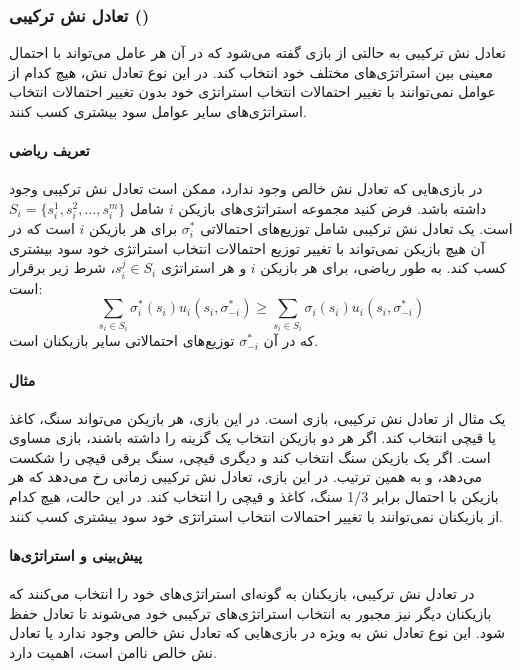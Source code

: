 \subsubsection{تعادل نش ترکیبی ()}
تعادل نش ترکیبی به حالتی از بازی گفته می‌شود که در آن هر عامل می‌تواند با احتمال معینی بین استراتژی‌های مختلف خود انتخاب کند. در این نوع تعادل نش، هیچ کدام از عوامل نمی‌توانند با تغییر احتمالات انتخاب استراتژی خود بدون تغییر احتمالات انتخاب استراتژی‌های سایر عوامل سود بیشتری کسب کنند.

\paragraph{تعریف ریاضی}
در بازی‌هایی که تعادل نش خالص وجود ندارد، ممکن است تعادل نش ترکیبی وجود داشته باشد. فرض کنید مجموعه استراتژی‌های بازیکن \( i \) شامل \( S_i = \{s_i^1, s_i^2, \dots, s_i^m\} \) است. یک تعادل نش ترکیبی شامل توزیع‌های احتمالاتی \( \sigma_i^* \) برای هر بازیکن \( i \) است که در آن هیچ بازیکن نمی‌تواند با تغییر توزیع احتمالات انتخاب استراتژی خود سود بیشتری کسب کند. به طور ریاضی، برای هر بازیکن \( i \) و هر استراتژی \( s_i^j \in S_i \)، شرط زیر برقرار است:
\[
\sum_{s_i \in S_i} \sigma_i^*(s_i) u_i(s_i, \sigma_{-i}^*) \geq \sum_{s_i \in S_i} \sigma_i(s_i) u_i(s_i, \sigma_{-i}^*)
\]
که در آن \( \sigma_{-i}^* \) توزیع‌های احتمالاتی سایر بازیکنان است.

\paragraph{مثال}
یک مثال از تعادل نش ترکیبی، بازی  است. در این بازی، هر بازیکن می‌تواند سنگ، کاغذ یا قیچی انتخاب کند. اگر هر دو بازیکن انتخاب یک گزینه را داشته باشند، بازی مساوی است. اگر یک بازیکن سنگ انتخاب کند و دیگری قیچی، سنگ برقی قیچی را شکست می‌دهد، و به همین ترتیب. در این بازی، تعادل نش ترکیبی زمانی رخ می‌دهد که هر بازیکن با احتمال برابر 1/3 سنگ، کاغذ و قیچی را انتخاب کند. در این حالت، هیچ کدام از بازیکنان نمی‌توانند با تغییر احتمالات انتخاب استراتژی خود سود بیشتری کسب کنند.

\paragraph{پیش‌بینی و استراتژی‌ها}
در تعادل نش ترکیبی، بازیکنان به گونه‌ای استراتژی‌های خود را انتخاب می‌کنند که بازیکنان دیگر نیز مجبور به انتخاب استراتژی‌های ترکیبی خود می‌شوند تا تعادل حفظ شود. این نوع تعادل نش به ویژه در بازی‌هایی که تعادل نش خالص وجود ندارد یا تعادل نش خالص ناامن است، اهمیت دارد.

